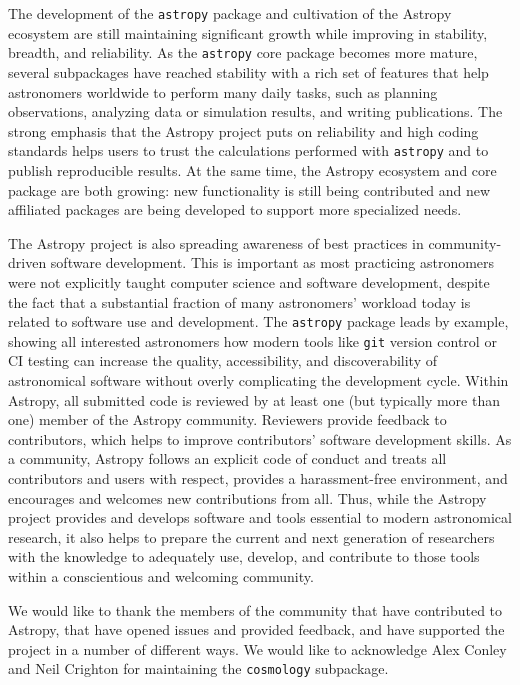 \documentclass[modern]{aastex62}
\newcommand{\package}[1]{\texttt{#1}\xspace}
\newcommand{\astropy}{Astropy\xspace}
\newcommand{\astropypkg}{\package{astropy}}
\begin{document}
The development of the \astropypkg package and cultivation of the \astropy
ecosystem are still maintaining significant growth while improving in stability,
breadth, and reliability.
As the \astropypkg core package becomes more mature, several subpackages have
reached stability with a rich set of features that help astronomers worldwide to
perform many daily tasks, such as planning observations, analyzing data or
simulation results, and writing publications.
The strong emphasis that the \astropy project puts on reliability and high coding
standards helps users to trust the calculations performed with \astropypkg and
to publish reproducible results.
At the same time, the \astropy ecosystem and core package are both growing: new
functionality is still being contributed and new affiliated packages are being
developed to support more specialized needs.

The \astropy project is also spreading awareness of best practices in
community-driven software development.
This is important as most practicing astronomers were not explicitly taught
computer science and software development, despite the fact that a substantial
fraction of many astronomers' workload today is related to software use
and development.
The \astropypkg package leads by example, showing all interested astronomers how
modern tools like \texttt{git} version control or CI testing can
increase the quality, accessibility, and discoverability of astronomical
software without overly complicating the development cycle.
Within \astropy, all submitted code is reviewed by at least one (but typically
more than one) member of the \astropy community. Reviewers provide feedback
to contributors, which helps to improve contributors' software development skills.
As a community, \astropy follows an explicit code of conduct \citep{ape8} and treats all
contributors and users with respect, provides a harassment-free environment, and
encourages and welcomes new contributions from all.
Thus, while the \astropy project provides and develops software and tools
essential to modern astronomical research, it also helps to prepare the current
and next generation of researchers with the knowledge to adequately use,
develop, and contribute to those tools within a conscientious and welcoming
community.

\acknowledgments

We would like to thank the members of the community that have
contributed to \astropy,
that have opened issues and provided feedback, and have supported the
project in a number of different ways.  We would like to acknowledge
Alex Conley and Neil Crighton for maintaining the  \package{cosmology}
subpackage.
\end{document}
